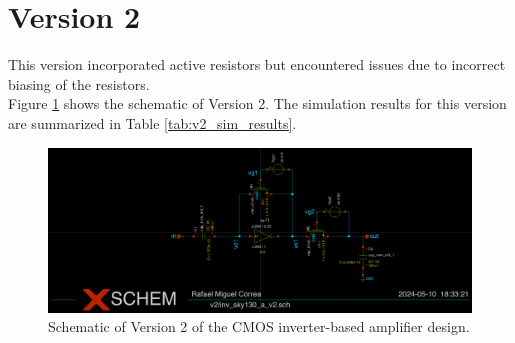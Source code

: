 \section{Version 2}
This version incorporated active resistors but encountered issues due to incorrect biasing of the resistors.
\\
Figure \ref{fig:v2_schematic} shows the schematic of Version 2. 
The simulation results for this version are summarized in Table \ref{tab:v2_sim_results}.
\begin{figure}[ht!]
    \centering
    \includegraphics[width=\textwidth]{Figures/v2_schematic.png}
    \caption{Schematic of Version 2 of the CMOS inverter-based amplifier design.}
    \label{fig:v2_schematic}
\end{figure}

